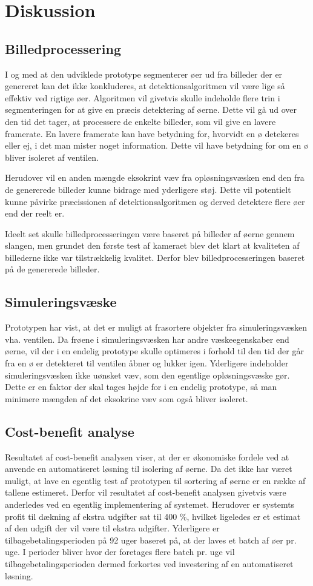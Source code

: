 \chapter{Diskussion}

\section{Billedprocessering}
I og med at den udviklede prototype segmenterer øer ud fra billeder der er genereret kan det ikke konkluderes, at detektionsalgoritmen vil være lige så effektiv ved rigtige øer. Algoritmen vil givetvis skulle indeholde flere trin i segmenteringen for at give en præcis detektering af øerne. Dette vil gå ud over den tid det tager, at processere de enkelte billeder, som vil give en lavere framerate. En lavere framerate kan have betydning for, hvorvidt en ø detekeres eller ej, i det man mister noget information. Dette vil have betydning for om en ø bliver isoleret af ventilen.

Herudover vil en anden mængde eksokrint væv fra opløsningsvæsken end den fra de genererede billeder kunne bidrage med yderligere støj. Dette vil potentielt kunne påvirke præcissionen af detektionsalgoritmen og derved detektere flere øer end der reelt er. 

Ideelt set skulle billedprocesseringen være baseret på billeder af øerne gennem slangen, men grundet den første test af kameraet blev det klart at kvaliteten af billederne ikke var tilstrækkelig kvalitet. Derfor blev billedprocesseringen baseret på de genererede billeder. 
\section{Simuleringsvæske}
Prototypen har vist, at det er muligt at frasortere objekter fra simuleringsvæsken vha. ventilen. Da frøene i simuleringsvæsken har andre væskeegenskaber end øerne, vil der i en endelig prototype skulle optimeres i forhold til den tid der går fra en ø er detekteret til ventilen åbner og lukker igen. Yderligere indeholder simuleringsvæsken ikke uønsket væv, som den egentlige opløsningsvæske gør. Dette er en faktor der skal tages højde for i en endelig prototype, så man minimere mængden af det eksokrine væv som også bliver isoleret.


\section{Cost-benefit analyse}
Resultatet af cost-benefit analysen viser, at der er økonomiske fordele ved at anvende en automatiseret løsning til isolering af øerne. Da det ikke har været muligt, at lave en egentlig test af prototypen til sortering af øerne er en række af tallene estimeret. Derfor vil resultatet af cost-benefit analysen givetvis være anderledes ved en egentlig implementering af systemet. Herudover er systemts profit til dækning af ekstra udgifter sat til 400 \%, hvilket ligeledes er et estimat af den udgift der vil være til ekstra udgifter. Yderligere er tilbagebetalingsperioden på 92 uger baseret på, at der laves et batch af øer pr. uge. I perioder bliver hvor der foretages flere batch pr. uge vil tilbagebetalingsperioden dermed forkortes ved investering af en automatiseret løsning.

